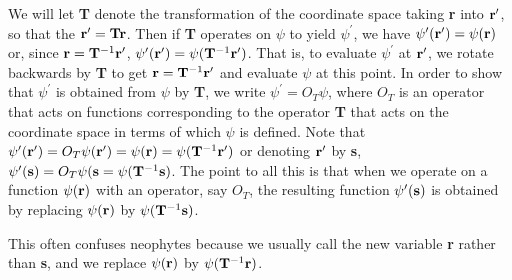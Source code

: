 We will let {\bf T} denote the transformation of the coordinate space 
taking {\bf r} into ${\bf r}^{\prime}$, so that the ${\bf 
r}^{\prime} = {\bf Tr}$.  Then if {\bf T} operates on $\psi$ to yield 
$\psi^{\prime}$, we have $\psi^{\prime}({\bf r}^{\prime}) = \psi({\bf 
r})$ or, since ${\bf r} = {\bf T}^{-1}{\bf r}^{\prime}$, 
$\psi^{\prime}({\bf r}^{\prime}) = \psi({\bf T}^{-1}{\bf 
r}^{\prime})$.  That is, to evaluate $\psi^{\prime}$ at ${\bf 
r}^{\prime}$, we rotate backwards by {\bf T} to get ${\bf r} = {\bf 
T}^{-1} {\bf r}^{\prime}$ and evaluate $\psi$ at this point. In order 
to show that $\psi^{\prime}$ is obtained from $\psi$ by {\bf T}, we 
write $\psi^{\prime} = O_{T}\psi$, where $O_T$ is an operator that 
acts on functions corresponding to the operator {\bf T} that acts 
on the coordinate space in terms of which $\psi$ is defined.  Note that
$\psi^{\prime}({\bf r}^{\prime}) = O_T \psi({\bf r}^{\prime}) = 
\psi({\bf r}) = \psi ( {\bf T}^{-1} {\bf r}^{\prime})$ or 
denoting ${\bf r}^{\prime}$ by {\bf s}, $\psi^{\prime}({\bf s}) = O_T 
\psi({\bf s} = \psi({\bf T}^{-1}{\bf s})$.  The point to all this is 
that when we operate on a function $\psi({\bf r})$ with an operator, 
say $O_T$, the resulting function $\psi^{\prime}({\bf s})$ is 
obtained by replacing $\psi({\bf r})$ by $\psi({\bf T}^{-1}{\bf s})$.

This often confuses neophytes because we usually call the new 
variable {\bf r} rather than {\bf s}, and we replace $\psi({\bf r})$ 
by $\psi({\bf T}^{-1}{\bf r})$.

